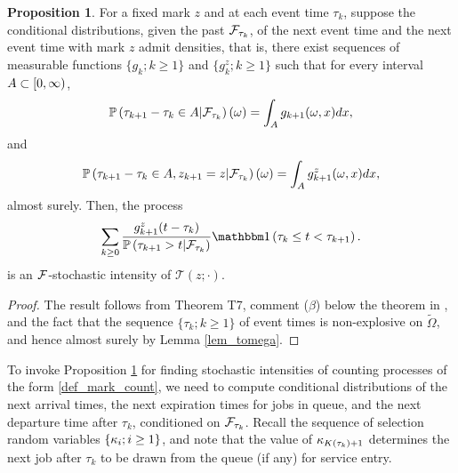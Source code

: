 \documentclass{article}
\theoremstyle{definition}
\newtheorem{proposition}[theorem]{Proposition}
\numberwithin{equation}{section}
\begin{document}
\begin{proposition}\label{prop_intensity}
For a fixed mark $z$ and at each event time $\tau_k$, suppose the conditional distributions, given the past $\mathcal{F}_{\tau_k}$, of the next event time and the next event time with mark $z$ admit densities, that is, there exist sequences of measurable functions $\{g_k;k\geq1\}$ and $\{g_{k}^z;k\geq1\}$ such that for every interval $A\subset[0,\infty)$,
\begin{equation}\label{tau_density}
\mathbb{P}\left(\tau_{k+1}-\tau_k\in A|\mathcal{F}_{\tau_k}\right)(\omega)= \int_A g_{k+1}(\omega,x)dx,
\end{equation}
and
\[
\mathbb{P}\left(\tau_{k+1}-\tau_k\in A,z_{k+1}=z|\mathcal{F}_{\tau_k}\right)(\omega)= \int_A g_{k+1}^z(\omega,x)dx,
\]
almost surely. Then, the process
\begin{equation}\label{intensity_form}
\sum_{k\geq0}\frac{g_{k+1}^z(t-\tau_k)}{\Prob{\tau_{k+1}>t|\filt_{\tau_k}}}\indic{\tau_k\leq t < \tau_{k+1}}.
\end{equation}
is an $\mathcal{F}$-stochastic intensity of $\mathcal{T}(z;\cdot)$.
\end{proposition}
\begin{proof}
The result follows from Theorem T7, comment ($\beta$) below the theorem in  \cite[page 61]{BremaudBook}, and the fact that  the sequence $\{\tau_k;k\geq 1\}$ of event times is non-explosive on $\tilde\Omega$, and hence almost surely by Lemma \ref{lem_tomega}.
\end{proof}



To invoke Proposition \ref{prop_intensity} for finding stochastic intensities of counting processes of the form  \eqref{def_mark_count}, we need to compute conditional distributions of the next arrival times, the next expiration times for jobs in queue, and the next departure time after $\tau_k$, conditioned on ${\mathcal{F}_{\tau_k}}$. Recall the sequence of selection random variables $\{\kappa_i;i\geq1\}$, and note that the value of $\kappa_{K(\tau_k)+1}$ determines the next job after $\tau_k$ to be drawn from the queue (if any) for service entry.
\end{document}
